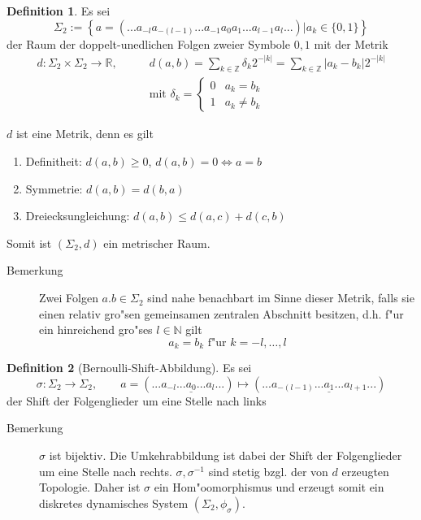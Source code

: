 \documentclass[a4paper, 13pt]{scrreprt}
\theoremstyle{definition} \newtheorem{definition}{Definition}[section]
\begin{document}
\begin{definition}
Es sei 
	\[\Sigma_2 := \left\{a = (...a_{-l}a_{-(l-1)}...a_{-1}a_0a_1...a_{l-1}a_l...) | a_k \in \{0,1\}\right\} \]
	der Raum der doppelt-unedlichen Folgen zweier Symbole \(0,1\) mit der Metrik 
		\begin{align*}d: \Sigma_2\times\Sigma_2 \to \mathbb{R}, \qquad
		&d(a,b)= \sum_{k \in\mathbb{Z}} \delta_k2^{-|k|} = \sum_{k\in \mathbb{Z}} |a_k-b_k|2^{-|k|} \\
		&\text{mit } \delta_k = \begin{cases} 0 & a_k=b_k \\ 1 & a_k\not= b_k \end{cases}
		\end{align*}
\end{definition}
\(d\) ist eine Metrik, denn es gilt
\begin{enumerate}
	\item Definitheit: \(d(a,b) \geq 0\), \(d(a,b) = 0 \Leftrightarrow a=b\)
	\item Symmetrie: \(d(a,b)= d(b,a)\)
	\item Dreiecksungleichung: \(d(a,b) \leq d(a,c) + d(c,b)\)
\end{enumerate}
Somit ist \((\Sigma_2, d)\) ein metrischer Raum.

\begin{description}
	\item[Bemerkung] Zwei Folgen \(a.b \in \Sigma_2\) sind nahe benachbart im Sinne dieser Metrik, falls sie einen relativ gro"sen gemeinsamen zentralen Abschnitt besitzen, d.h. f"ur ein hinreichend gro"ses $l\in\mathbb{N}$ gilt
	$$ a_k = b_k \mbox{ f"ur } k = -l, \ldots, l$$	
\end{description}

\begin{definition}[Bernoulli-Shift-Abbildung]
Es sei 
	\[\sigma:\Sigma_2 \to \Sigma_2, \qquad a=(...a_{-l}...\underline{a_0}...a_l...) \mapsto (...a_{-(l-1)}...\underline{a_1}...a_{l+1}...) \]
der Shift der Folgenglieder um eine Stelle nach links

\end{definition}

\begin{description}
	\item[Bemerkung] \(\sigma\) ist bijektiv. Die Umkehrabbildung ist dabei der Shift der Folgenglieder um eine Stelle nach rechts. \(\sigma,\sigma^{-1}\) sind stetig bzgl. der von \(d\) erzeugten Topologie. Daher ist $\sigma$ ein Hom"oomorphismus und erzeugt somit ein diskretes dynamisches System \((\Sigma_2,\phi_\sigma)\).
\end{description}
\end{document}

